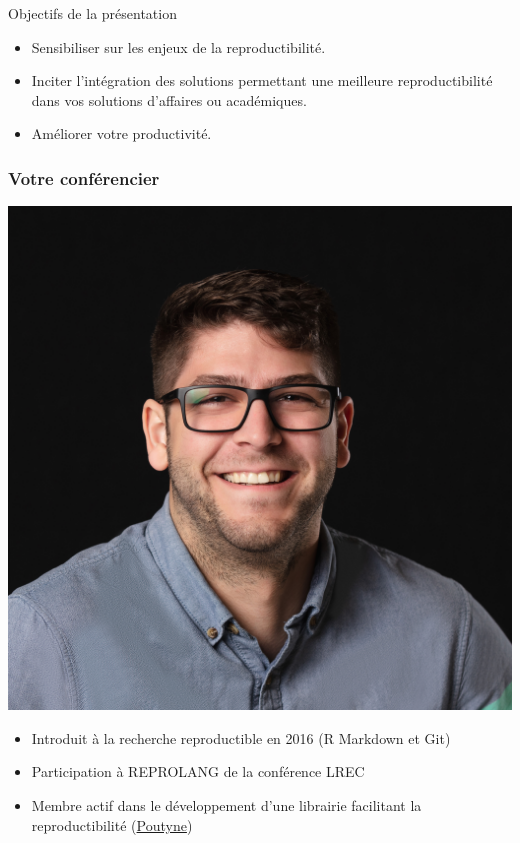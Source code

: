 \documentclass[aspectratio=169,10pt,xcolor=x11names,english,french]{beamer}
\begin{document}
	
	
	\begin{frame}{Objectifs de la présentation}
		\begin{itemize}
			\item Sensibiliser sur les enjeux de la reproductibilité.
			\item Inciter l'intégration des solutions permettant une meilleure reproductibilité dans vos solutions d'affaires ou académiques.
			\item Améliorer votre productivité.
		\end{itemize}
	\end{frame}
	
	\begin{frame}
		\frametitle{Votre conférencier}
		
		\begin{minipage}{0.25\linewidth}
			\includegraphics[width=\linewidth,keepaspectratio]{img/david}
		\end{minipage}
		\hfill
		\begin{minipage}{0.70\linewidth}
			\begin{itemize}
				\item Introduit à la recherche reproductible en 2016 (R Markdown et Git)
				\item Participation à REPROLANG de la conférence LREC \cite{garneau2020robust}
				\item Membre actif dans le développement d'une librairie facilitant la reproductibilité (\href{https://poutyne.org/}{Poutyne})
			\end{itemize}
		\end{minipage}
		

\end{frame}
\end{document}
